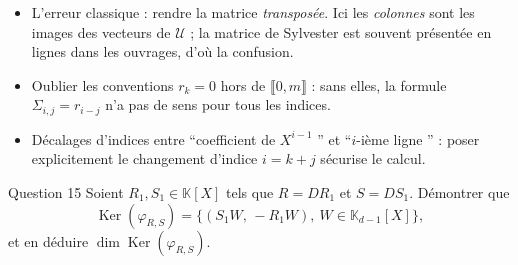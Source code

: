 \documentclass[11pt,a4paper]{article}
\newcommand{\og}{``}
\newcommand{\fg}{''}
\newcommand{\K}{\mathbb{K}}
\newcommand{\ii}[2]{\llbracket #1,#2\rrbracket}
\DeclareMathOperator{\Ker}{Ker}
\begin{document}
\begin{pieges}
\begin{itemize}[leftmargin=1.4em, itemsep=2pt]
\item L'erreur classique : rendre la matrice \emph{transposée}. Ici les
\emph{colonnes} sont les images des vecteurs de $\mathcal{U}$ ; la
matrice de Sylvester est souvent présentée en lignes dans les
ouvrages, d'où la confusion.
\item Oublier les conventions $r_k=0$ hors de $\ii{0}{m}$ : sans
elles, la formule $\Sigma_{i,j}=r_{i-j}$ n'a pas de sens pour tous
les indices.
\item Décalages d'indices entre \og coefficient de $X^{i-1}$ \fg{} et
\og $i$-ième ligne \fg{} : poser explicitement le changement d'indice
$i=k+j$ sécurise le calcul.
\end{itemize}
\end{pieges}

\begin{enonce}{Question 15}
Soient $R_1,S_1\in\K[X]$ tels que $R=DR_1$ et $S=DS_1$. Démontrer que
\[
\Ker(\varphi_{R,S})=\big\{(S_1W,\,-R_1W),\ W\in\K_{d-1}[X]\big\},
\]
et en déduire $\dim\Ker(\varphi_{R,S})$.
\end{enonce}
\end{document}
